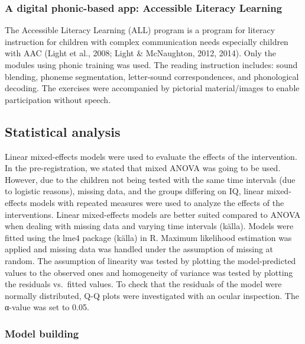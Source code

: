 \documentclass[
]{article}
\begin{document}
\hypertarget{a-digital-phonic-based-app-accessible-literacy-learning}{%
\subsubsection{A digital phonic-based app: Accessible Literacy
Learning}\label{a-digital-phonic-based-app-accessible-literacy-learning}}

The Accessible Literacy Learning (ALL) program is a program for literacy
instruction for children with complex communication needs especially
children with AAC (Light et al., 2008; Light \& McNaughton, 2012, 2014).
Only the modules using phonic training was used. The reading instruction
includes: sound blending, phoneme segmentation, letter-sound
correspondences, and phonological decoding. The exercises were
accompanied by pictorial material/images to enable participation without
speech.

\hypertarget{statistical-analysis}{%
\subsection{Statistical analysis}\label{statistical-analysis}}

Linear mixed-effects models were used to evaluate the effects of the
intervention. In the pre-registration, we stated that mixed ANOVA was
going to be used. However, due to the children not being tested with the
same time intervals (due to logistic reasons), missing data, and the
groups differing on IQ, linear mixed-effects models with repeated
measures were used to analyze the effects of the interventions. Linear
mixed-effects models are better suited compared to ANOVA when dealing
with missing data and varying time intervals (källa). Models were fitted
using the lme4 package (källa) in R. Maximum likelihood estimation was
applied and missing data was handled under the assumption of missing at
random. The assumption of linearity was tested by plotting the
model-predicted values to the observed ones and homogeneity of variance
was tested by plotting the residuals vs.~fitted values. To check that
the residuals of the model were normally distributed, Q-Q plots were
investigated with an ocular inspection. The α-value was set to 0.05.

\hypertarget{model-building}{%
\subsubsection{Model building}\label{model-building}}
\end{document}
